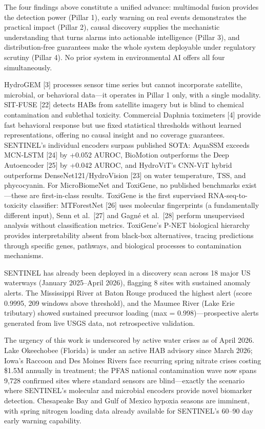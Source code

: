 \documentclass[12pt]{article}
\begin{document}
The four findings above constitute a unified advance: multimodal fusion provides the detection power (Pillar 1), early warning on real events demonstrates the practical impact (Pillar 2), causal discovery supplies the mechanistic understanding that turns alarms into actionable intelligence (Pillar 3), and distribution-free guarantees make the whole system deployable under regulatory scrutiny (Pillar 4). No prior system in environmental AI offers all four simultaneously.

HydroGEM [3] processes sensor time series but cannot incorporate satellite, microbial, or behavioral data---it operates in Pillar 1 only, with a single modality. SIT-FUSE [22] detects HABs from satellite imagery but is blind to chemical contamination and sublethal toxicity. Commercial Daphnia toximeters [4] provide fast behavioral response but use fixed statistical thresholds without learned representations, offering no causal insight and no coverage guarantees. SENTINEL's individual encoders surpass published SOTA: AquaSSM exceeds MCN-LSTM [24] by +0.052 AUROC, BioMotion outperforms the Deep Autoencoder [25] by +0.042 AUROC, and HydroViT's CNN-ViT hybrid outperforms DenseNet121/HydroVision [23] on water temperature, TSS, and phycocyanin. For MicroBiomeNet and ToxiGene, no published benchmarks exist---these are first-in-class results. ToxiGene is the first supervised RNA-seq-to-toxicity classifier: MTForestNet [26] uses molecular fingerprints (a fundamentally different input), Senn et al.\ [27] and Gagn\'e et al.\ [28] perform unsupervised analysis without classification metrics. ToxiGene's P-NET biological hierarchy provides interpretability absent from black-box alternatives, tracing predictions through specific genes, pathways, and biological processes to contamination mechanisms.

SENTINEL has already been deployed in a discovery scan across 18 major US waterways (January 2025--April 2026), flagging 8 sites with sustained anomaly alerts. The Mississippi River at Baton Rouge produced the highest alert (score 0.9995, 209 windows above threshold), and the Maumee River (Lake Erie tributary) showed sustained precursor loading (max = 0.998)---prospective alerts generated from live USGS data, not retrospective validation.

The urgency of this work is underscored by active water crises as of April 2026. Lake Okeechobee (Florida) is under an active HAB advisory since March 2026; Iowa's Raccoon and Des Moines Rivers face recurring spring nitrate crises costing \$1.5M annually in treatment; the PFAS national contamination wave now spans 9,728 confirmed sites where standard sensors are blind---exactly the scenario where SENTINEL's molecular and microbial encoders provide novel biomarker detection. Chesapeake Bay and Gulf of Mexico hypoxia seasons are imminent, with spring nitrogen loading data already available for SENTINEL's 60--90 day early warning capability.
\end{document}
